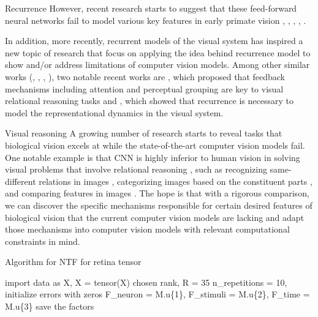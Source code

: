 \documentclass[xcolor={dvipsnames,svgnames}]{beamer}
\begin{document}
\begin{frame}{Recurrence}
    However, recent research starts to suggest that these feed-forward neural networks fail to model various key features in early primate vision  \cite{oreilly_recurrent_2013}, \cite{spoerer_recurrent_2017}, \cite{ricci_same-different_2018}, \cite{kietzmann_recurrence_2019}, \cite{van_bergen_going_2020}.
    
    In addition, more recently, recurrent models of the visual system has inspired a new topic of research that focus on applying the idea behind recurrence model to show and/or address limitations of computer vision models. Among other similar works (\cite{oreilly_recurrent_2013}, \cite{spoerer_recurrent_2017},  \cite{kietzmann_recurrence_2019}, \cite{van_bergen_going_2020}), two notable recent works are \cite{ricci_same-different_2018}, which proposed that feedback mechanisms including attention and perceptual grouping are key to visual relational reasoning tasks and \cite{kietzmann_recurrence_2019}, which showed that recurrence is necessary to model the representational dynamics in the visual system.

\end{frame}

\begin{frame}{Visual reasoning}
    A growing number of research starts to reveal tasks that biological vision excels at while the state-of-the-art computer vision models fail. One notable example is that CNN is highly inferior to human vision in solving visual problems that involve relational reasoning \cite{glorot-bengio-difficulty}, such as recognizing same-different relations in images \cite{ricci_same-different_2018}, categorizing images based on the constituent parts \cite{visual-categorization}, and comparing features in images  \cite{cnn-human-abstraction}. The hope is that with a rigorous comparison, we can discover the specific mechanisms responsible for certain desired features of biological vision that the current computer vision models are lacking and adapt those mechanisms into computer vision models with relevant computational constraints in mind.
\end{frame}

\begin{frame}{Algorithm for NTF for retina tensor}
\begin{algorithm}[H]
\caption{Algorithm for NTF on retina tensor.}\label{alg:factors-retina}
\DontPrintSemicolon
import data as X, X = tensor(X) \;
chosen rank, R = 35 \;
n\_repetitions = 10, initialize errors with zeros \; 
F\_neuron = M.u\{1\}, F\_stimuli = M.u\{2\}, F\_time = M.u\{3\} \;
save the factors \;
\end{algorithm}
\end{frame}
\end{document}
